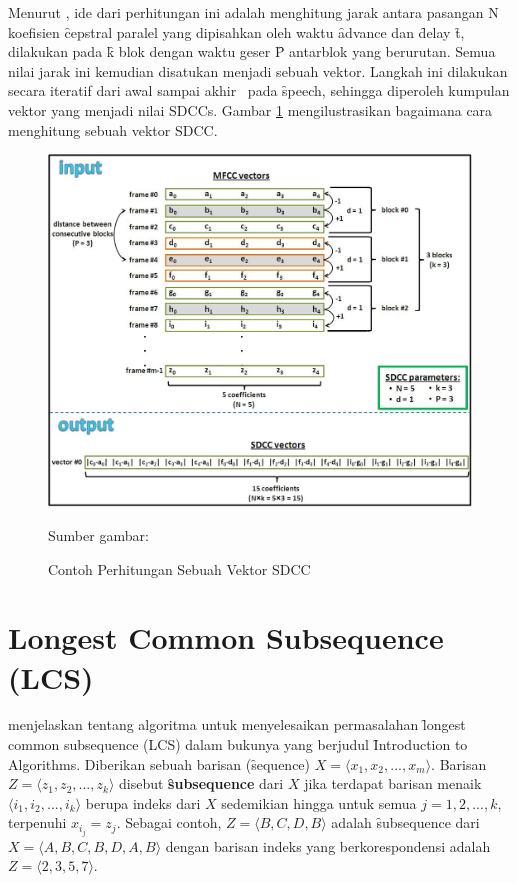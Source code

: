   Menurut \cite{zahra2013unique}, ide dari perhitungan ini adalah menghitung jarak antara pasangan N koefisien \f{cepstral} paralel yang dipisahkan oleh waktu \f{advance} dan \f{delay} \f{t}, dilakukan pada \f{k} blok dengan waktu geser \f{P} antarblok yang berurutan. Semua nilai jarak ini kemudian disatukan menjadi sebuah vektor. Langkah ini dilakukan secara iteratif dari awal sampai akhir \fr~pada \f{speech}, sehingga diperoleh kumpulan vektor yang menjadi nilai SDCCs. Gambar \ref{fig:hitungsdcc} mengilustrasikan bagaimana cara menghitung sebuah vektor SDCC.
  \begin{figure}
    \centering
    \includegraphics[width=\linewidth]{pics/hitung_sdcc}
    \caption{Contoh Perhitungan Sebuah Vektor SDCC}{Sumber gambar: \cite{zahra2013unique}}
    \label{fig:hitungsdcc}
  \end{figure}



\section{Longest Common Subsequence (LCS)}\label{lcs}
\cite{Cormen:2009:IAT:1614191} menjelaskan tentang algoritma untuk menyelesaikan permasalahan \f{longest common subsequence} (LCS) dalam bukunya yang berjudul \f{Introduction to Algorithms}. Diberikan sebuah barisan (\f{sequence}) $X=\langle x_1,x_2,...,x_m\rangle$. Barisan $Z=\langle z_1,z_2,...,z_k\rangle$ disebut \textbf{\f{subsequence}} dari $X$ jika terdapat barisan menaik $\langle i_1,i_2,...,i_k\rangle$ berupa indeks dari $X$ sedemikian hingga untuk semua $j=1,2,...,k$, terpenuhi $x_{i_j}=z_j$. Sebagai contoh, $Z=\langle B,C,D,B\rangle$ adalah \f{subsequence} dari $X=\langle A,B,C,B,D,A,B\rangle$ dengan barisan indeks yang berkorespondensi adalah $Z=\langle 2,3,5,7\rangle$.

